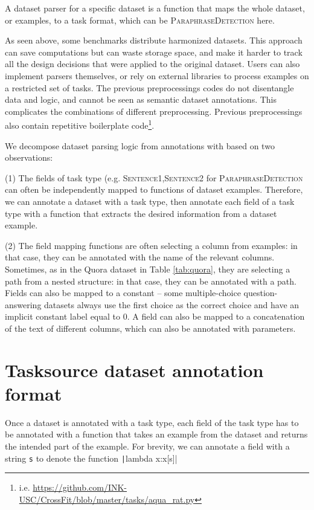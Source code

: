 \documentclass[11pt]{article}
\begin{document}
A dataset parser for a specific dataset is a function that maps the whole dataset, or examples, to a task format, which can be \textsc{ParaphraseDetection} here.

As seen above, some benchmarks distribute harmonized datasets. This approach can save computations but can waste storage space, and make it harder to track all the design decisions that were applied to the original dataset. Users can also implement parsers themselves, or rely on external libraries to process examples on a restricted set of tasks. The previous preprocessings codes do not disentangle data and logic, and cannot be seen as semantic dataset annotations. This complicates the combinations of different preprocessing. Previous preprocessings also contain repetitive boilerplate code\footnote{i.e. \url{https://github.com/INK-USC/CrossFit/blob/master/tasks/aqua_rat.py}}.

We decompose  dataset parsing logic from annotations with  based on two observations:

(1) The fields of task type (e.g. \textsc{Sentence1},\textsc{Sentence2} for \textsc{ParaphraseDetection} can often be independently mapped to functions of dataset examples. Therefore, we can annotate a dataset with a task type, then annotate each field of a task type with a function that extracts the desired information from a dataset example.

(2) The field mapping functions are often selecting a column from examples: in that case, they can be annotated with the name of the relevant columns. Sometimes, as in the Quora dataset in Table \ref{tab:quora}, they are selecting a path from a nested structure: in that case, they can be annotated with a path. Fields can also be mapped to a constant -- some multiple-choice question-answering datasets always use the first choice as the correct choice and have an implicit constant label equal to 0. A field can also be mapped to a concatenation of the text of different columns, which can also be annotated with parameters.




\section{Tasksource dataset annotation format}


Once a dataset is annotated with a task type, each field of the task type has to be annotated with a function that takes an example from the dataset and returns the intended part of the example.
For brevity, we can annotate a field with a string \texttt{s} to denote the function \texttt|lambda x:x[s]|
\end{document}
